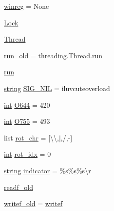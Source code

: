 \begin{DoxyCompactItemize}
\item 
\hyperlink{namespacewaflib_1_1_utils_a05bae49c975b395dc557f12597e2d085}{winreg} = None
\item 
\hyperlink{namespacewaflib_1_1_utils_a5982edd74992ec9be99487a0019d8bca}{Lock}
\item 
\hyperlink{namespacewaflib_1_1_utils_a8b8c9376d2218d717e79be5533b85e76}{Thread}
\item 
\hyperlink{namespacewaflib_1_1_utils_a96422e58ba2ec856c0afb76c8149ecda}{run\+\_\+old} = threading.\+Thread.\+run
\item 
\hyperlink{namespacewaflib_1_1_utils_a6200590837191af7edebc88e527caa98}{run}
\item 
\hyperlink{test__lib_f_l_a_c_2format_8c_ab02026ad0de9fb6c1b4233deb0a00c75}{string} \hyperlink{namespacewaflib_1_1_utils_aba461c8de1ea539718eefe5013d2e39c}{S\+I\+G\+\_\+\+N\+IL} = \textquotesingle{}iluvcuteoverload\textquotesingle{}
\item 
\hyperlink{xmltok_8h_a5a0d4a5641ce434f1d23533f2b2e6653}{int} \hyperlink{namespacewaflib_1_1_utils_ade9dd27fadbf52a0641bbff06d3dd3ac}{O644} = 420
\item 
\hyperlink{xmltok_8h_a5a0d4a5641ce434f1d23533f2b2e6653}{int} \hyperlink{namespacewaflib_1_1_utils_a8b5303a851e4ada6a9bca3ed5c4bf8af}{O755} = 493
\item 
list \hyperlink{namespacewaflib_1_1_utils_ada63dd48800b61412a762dfe4ea4d6c4}{rot\+\_\+chr} = \mbox{[}\textquotesingle{}\textbackslash{}\textbackslash{}\textquotesingle{},\textquotesingle{}$\vert$\textquotesingle{},\textquotesingle{}/\textquotesingle{},\textquotesingle{}-\/\textquotesingle{}\mbox{]}
\item 
\hyperlink{xmltok_8h_a5a0d4a5641ce434f1d23533f2b2e6653}{int} \hyperlink{namespacewaflib_1_1_utils_a3f8bc515e993d1c3241dad98231a28a4}{rot\+\_\+idx} = 0
\item 
\hyperlink{test__lib_f_l_a_c_2format_8c_ab02026ad0de9fb6c1b4233deb0a00c75}{string} \hyperlink{namespacewaflib_1_1_utils_a496439b70776ea74ef7305f1c411bf89}{indicator} = \textquotesingle{}\%\hyperlink{lib_2expat_8h_a755339d27872b13735c2cab829e47157}{s}\%\hyperlink{lib_2expat_8h_a755339d27872b13735c2cab829e47157}{s}\%s\textbackslash{}r\textquotesingle{}
\item 
\hyperlink{namespacewaflib_1_1_utils_a3bcc4295329e074ef499cde582b1007f}{readf\+\_\+old}
\item 
\hyperlink{namespacewaflib_1_1_utils_abf8ddd2dfd52e164e18730ced726a5bf}{writef\+\_\+old} = \hyperlink{namespacewaflib_1_1_utils_a5bf89e2dacc97e9c0fb551ea3c45fe9f}{writef}

\end{DoxyCompactItemize}
